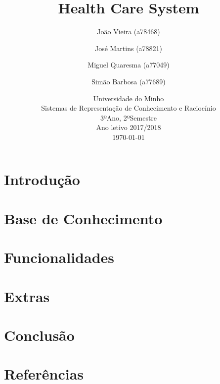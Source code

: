 \documentclass{article}
\begin{document}
\title{\vspace*{\fill}Health Care System}
\author{João Vieira (a78468) \and José Martins (a78821) \and Miguel Quaresma (a77049) \and Simão Barbosa (a77689)}
\date{%
    Universidade do Minho\\
    Sistemas de Representação de Conhecimento e Raciocínio\\
    3ºAno, 2ºSemestre\\
    Ano letivo 2017/2018\\[2ex]%
    \today\vspace*{\fill}
}
\maketitle

\newpage

\tableofcontents

\newpage

\section{Introdução}

\newpage

\section{Base de Conhecimento}

\section{Funcionalidades}

\section{Extras}

\newpage

\section{Conclusão}

\newpage

\section{Referências}
\end{document}
